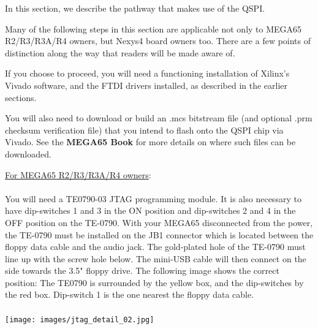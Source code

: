In this section, we describe the pathway that makes use of the QSPI.

Many of the following steps in this section are applicable not only to MEGA65 R2/R3/R3A/R4 owners, but Nexys4 board owners too. There are a few points of distinction along the way that readers will be made aware of.

If you choose to proceed, you will need a functioning installation of Xilinx's Vivado software, and the FTDI drivers installed, as described in the earlier sections.

You will also need to download or build an .mcs bitstream file (and optional
.prm checksum verification file) that you intend to flash onto the QSPI chip via
Vivado. See
the {\bf MEGA65 Book}
for more details on where such files can be downloaded.

\begin{tcolorbox}[colback=white,coltext=black]
\underline{For MEGA65 R2/R3/R3A/R4 owners}:\\
\\
You will need a TE0790-03 JTAG programming module. It is also necessary to have
dip-switches 1 and 3 in the ON position and dip-switches 2 and 4 in the
OFF position on the TE-0790.
With your MEGA65 disconnected from the power, the TE-0790 must be
installed on the JB1 connector which is located between the floppy data cable and the audio jack.
The gold-plated hole of the TE-0790 must line up with the screw
hole below.  The mini-USB cable will then connect on the side towards the 3.5" floppy drive.
The following image shows the correct position: The TE0790 is surrounded by the yellow box,
and the dip-switches by the red box. Dip-switch 1 is the one nearest the floppy data cable. \\
\\
\texttt{[image: images/jtag\_detail\_02.jpg]}
\end{tcolorbox}

